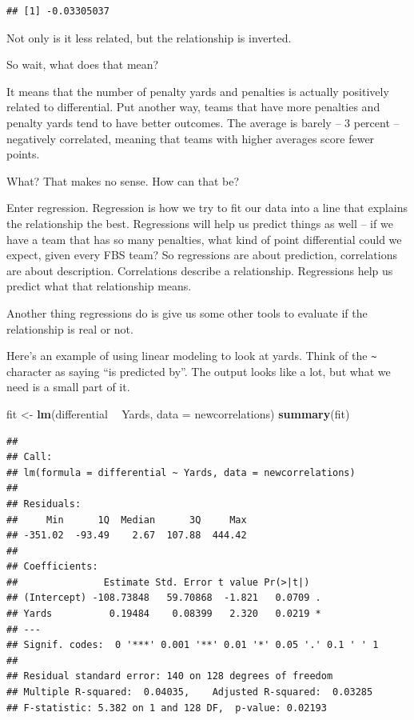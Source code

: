 \documentclass[]{book}
\newenvironment{Shaded}{\begin{snugshade}}{\end{snugshade}}
\newcommand{\KeywordTok}[1]{\textcolor[rgb]{0.13,0.29,0.53}{\textbf{#1}}}
\newcommand{\DataTypeTok}[1]{\textcolor[rgb]{0.13,0.29,0.53}{#1}}
\newcommand{\StringTok}[1]{\textcolor[rgb]{0.31,0.60,0.02}{#1}}
\newcommand{\OperatorTok}[1]{\textcolor[rgb]{0.81,0.36,0.00}{\textbf{#1}}}
\newcommand{\NormalTok}[1]{#1}
\begin{document}
\begin{verbatim}
## [1] -0.03305037
\end{verbatim}

Not only is it less related, but the relationship is inverted.

So wait, what does that mean?

It means that the number of penalty yards and penalties is actually
positively related to differential. Put another way, teams that have
more penalties and penalty yards tend to have better outcomes. The
average is barely -- 3 percent -- negatively correlated, meaning that
teams with higher averages score fewer points.

What? That makes no sense. How can that be?

Enter regression. Regression is how we try to fit our data into a line
that explains the relationship the best. Regressions will help us
predict things as well -- if we have a team that has so many penalties,
what kind of point differential could we expect, given every FBS team?
So regressions are about prediction, correlations are about description.
Correlations describe a relationship. Regressions help us predict what
that relationship means.

Another thing regressions do is give us some other tools to evaluate if
the relationship is real or not.

Here's an example of using linear modeling to look at yards. Think of
the \texttt{\textasciitilde{}} character as saying ``is predicted by''.
The output looks like a lot, but what we need is a small part of it.

\begin{Shaded}
\begin{Highlighting}[]
\NormalTok{fit <-}\StringTok{ }\KeywordTok{lm}\NormalTok{(differential }\OperatorTok{~}\StringTok{ }\NormalTok{Yards, }\DataTypeTok{data =}\NormalTok{ newcorrelations)}
\KeywordTok{summary}\NormalTok{(fit)}
\end{Highlighting}
\end{Shaded}

\begin{verbatim}
## 
## Call:
## lm(formula = differential ~ Yards, data = newcorrelations)
## 
## Residuals:
##     Min      1Q  Median      3Q     Max 
## -351.02  -93.49    2.67  107.88  444.42 
## 
## Coefficients:
##               Estimate Std. Error t value Pr(>|t|)  
## (Intercept) -108.73848   59.70868  -1.821   0.0709 .
## Yards          0.19484    0.08399   2.320   0.0219 *
## ---
## Signif. codes:  0 '***' 0.001 '**' 0.01 '*' 0.05 '.' 0.1 ' ' 1
## 
## Residual standard error: 140 on 128 degrees of freedom
## Multiple R-squared:  0.04035,    Adjusted R-squared:  0.03285 
## F-statistic: 5.382 on 1 and 128 DF,  p-value: 0.02193
\end{verbatim}
\end{document}
